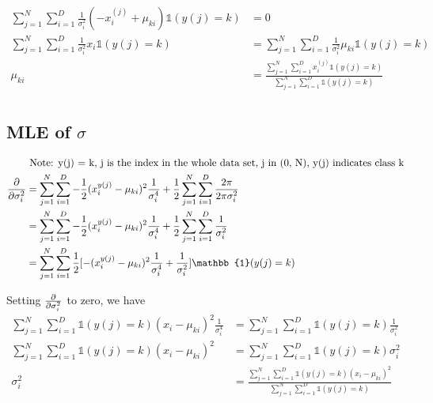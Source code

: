 \documentclass[letterpaper, 12]{article}
\begin{document}

\begin{equation*}
\begin{split}
\sum_{j = 1}^{N} \sum_{i = 1}^{D} \frac{1}{\sigma_{i} ^2}
		(- x_{i}^{(j)} + \mu_{ki})  \mathbb{1} ( y(j) = k) &= 0 \\
\sum_{j = 1}^{N} \sum_{i = 1}^{D} \frac{1}{\sigma_{i} ^2}  x_{i}  \mathbb{1} ( y(j) = k) &=\sum_{j = 1}^{N}  	\sum_{i = 1}^{D} \frac{1}{\sigma_{i} ^2} \mu_{ki}  \mathbb{1} ( y(j) = k) \\
\mu_{ki} &= \frac{\sum_{j = 1}^{N}\sum_{i = 1}^{D} x_{i}^{(j)}{\mathbb{1} ( y(j) = k)}}{\sum_{j = 1}^{N}\sum_{i = 1}^{D} {\mathbb{1} ( y(j) = k)}}\\
\end{split}
\end{equation*}

 
\subsection{MLE of $\sigma$}
\begin{equation*}
\begin{split}
&\text{	Note: y(j) = k, j is the index in the whole data set, j in (0, N), y(j) indicates class k}\\
\pdv{}{\sigma_{i} ^2} &= \sum_{j = 1}^{N} \sum_{i = 1}^{D} - \frac{1}{2}(x_{i}^{y(j)} - \mu_{ki})^2 \frac{1}{\sigma_{i} ^4} + \frac{1}{2}\sum_{j = 1}^{N} \sum_{i = 1}^{D} \frac{2 \pi}{2\pi \sigma_{i} ^2}\\
&=  \sum_{j = 1}^{N} \sum_{i = 1}^{D} - \frac{1}{2}(x_{i}^{y(j)} - \mu_{ki})^2 \frac{1}{\sigma_{i} ^4} + \frac{1}{2}\sum_{j = 1}^{N} \sum_{i = 1}^{D} \frac{1}{ \sigma_{i} ^2}\\
&= \sum_{j = 1}^{N}  \sum_{i = 1}^{D} \frac{1}{2} [ -(x_{i}^{y(j)} - \mu_{ki})^2 \frac{1}{\sigma_{i} ^4} + \frac{1}{\sigma_{i} ^2}]{\mathbb{1} ( y(j) = k)}\\
\end{split}
\end{equation*}
 
Setting $\pdv{}{\sigma_{i} ^2}$ to zero, we have\\

\begin{equation*}
\begin{split}
\sum_{j = 1}^{N}\sum_{i = 1}^{D} {\mathbb{1} ( y(j) = k)} (x_{i} - \mu_{ki})^2 \frac{1}{\sigma_{i} ^4}
&=\sum_{j = 1}^{N} \sum_{i=1}^{D} {\mathbb{1} ( y(j) = k)} \frac{1}{\sigma_{i} ^2}\\
\sum_{j = 1}^{N}\sum_{i = 1}^{D} {\mathbb{1} ( y(j) = k)} (x_{i} - \mu_{ki})^2 
&= \sum_{j = 1}^{N}\sum_{i=1}^{D} {\mathbb{1} ( y(j) = k)} \sigma_{i} ^2\\
\sigma_{i} ^2 &= \frac{\sum_{j = 1}^{N}\sum_{i = 1}^{D} {\mathbb{1} ( y(j) = k)} (x_{i} - \mu_{ki})^2}{\sum_{j = 1}^{N}\sum_{i=1}^{D} {\mathbb{1} ( y(j) = k)}}
\end{split}
\end{equation*}
\end{document}
